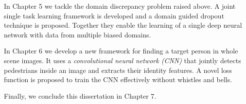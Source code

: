In Chapter 5 we tackle the domain discrepancy problem raised above. A joint single task learning framework is developed and a domain guided dropout technique is proposed. Together they enable the learning of a single deep neural network with data from multiple biased domains.

In Chapter 6 we develop a new framework for finding a target person in whole scene images. It uses a \emph{convolutional neural network (CNN)} that jointly detects pedestrians inside an image and extracts their identity features. A novel loss function is proposed to train the CNN effectively without whistles and bells.

Finally, we conclude this dissertation in Chapter 7.